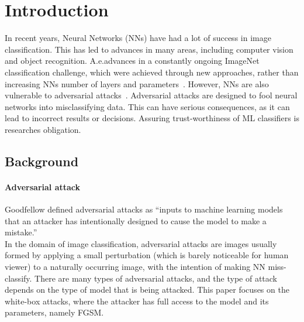 \section{Introduction}

In recent years, Neural Networks (NNs) have had a lot of success in image classification.
This has led to advances in many areas, including computer vision and object recognition.
A.e.advances in a constantly ongoing ImageNet classification challenge, which were achieved
through new approaches,
rather than increasing NNs number of layers and parameters~\cite{russakovsky2015imagenet,DBLP:journals/corr/abs-1905-11946}.
However, NNs are also vulnerable to adversarial attacks~\cite{ilyas2019adversarial}.
Adversarial attacks are designed to fool neural networks into misclassifying data.
This can have serious consequences, as it can lead to incorrect results or decisions.
Assuring trust-worthiness of ML classifiers is researches obligation.


\subsection{Background}

\paragraph{Adversarial attack}
Goodfellow defined adversarial attacks as “inputs to machine learning models that an
attacker has intentionally designed to cause the model to make a mistake.”
~\cite{DBLP:journals/corr/abs-1802-08195} \\
In the domain of image classification, adversarial attacks are images usually formed by applying a small perturbation
(which is barely noticeable for human viewer) to a naturally occurring image, with the intention of making NN miss-classify.
There are many types of adversarial attacks,
and the type of attack depends on the type of model that is being attacked.
This paper focuses on the white-box attacks, where the attacker has full access to the model and its parameters,
namely FGSM.

